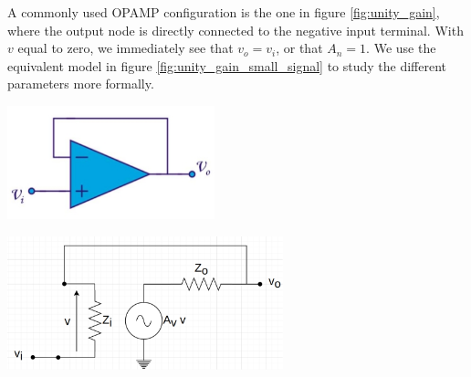 A commonly used OPAMP configuration is the one in figure \ref{fig:unity_gain}, where the output node is directly connected to the negative input terminal. With $v$ equal to zero, we immediately see that $v_o = v_i$, or that $A_n = 1$. We use the equivalent model in figure \ref{fig:unity_gain_small_signal} to study the different parameters more formally.\\
\begin{minipage}{.4\textwidth}
	\centering
	\includegraphics[width=6cm]{figures/app/opamp_ex2.jpg}
	\label{fig:unity_gain}
\end{minipage}%
\begin{minipage}{.6\textwidth}
	\centering
	\includegraphics[width=8cm]{figures/app/opamp_ex3b.jpg}
	\label{fig:unity_gain_small_signal}
\end{minipage}
